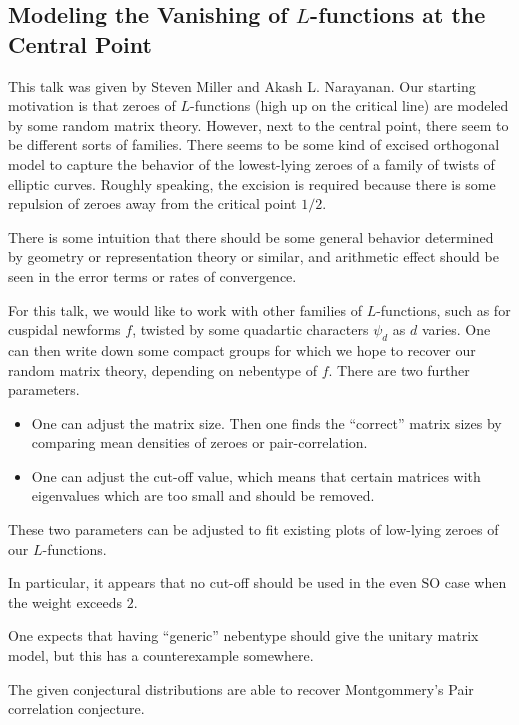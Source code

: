 \documentclass{article}
\begin{document}
\subsection{Modeling the Vanishing of \texorpdfstring{$L$}{ L}-functions at the Central Point}
This talk was given by Steven Miller and Akash L. Narayanan. Our starting motivation is that zeroes of $L$-functions (high up on the critical line) are modeled by some random matrix theory. However, next to the central point, there seem to be different sorts of families. There seems to be some kind of excised orthogonal model to capture the behavior of the lowest-lying zeroes of a family of twists of elliptic curves. Roughly speaking, the excision is required because there is some repulsion of zeroes away from the critical point $1/2$.
\begin{remark}
	There is some intuition that there should be some general behavior determined by geometry or representation theory or similar, and arithmetic effect should be seen in the error terms or rates of convergence.
\end{remark}
For this talk, we would like to work with other families of $L$-functions, such as for cuspidal newforms $f$, twisted by some quadartic characters $\psi_d$ as $d$ varies. One can then write down some compact groups for which we hope to recover our random matrix theory, depending on nebentype of $f$. There are two further parameters.
\begin{itemize}
	\item One can adjust the matrix size. Then one finds the ``correct'' matrix sizes by comparing mean densities of zeroes or pair-correlation.
	\item One can adjust the cut-off value, which means that certain matrices with eigenvalues which are too small and should be removed.
\end{itemize}
These two parameters can be adjusted to fit existing plots of low-lying zeroes of our $L$-functions.
\begin{example}
	In particular, it appears that no cut-off should be used in the even $\mathrm{SO}$ case when the weight exceeds $2$.
\end{example}
\begin{example}
	One expects that having ``generic'' nebentype should give the unitary matrix model, but this has a counterexample somewhere.
\end{example}
\begin{remark}
	The given conjectural distributions are able to recover Montgommery's Pair correlation conjecture.
\end{remark}
\end{document}
